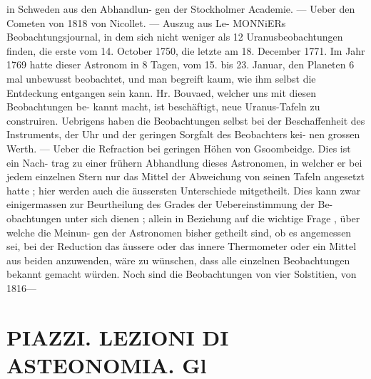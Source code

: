\documentclass[12pt,a4paper]{article}
\begin{document}
{{{{{{{{ in  Schweden  aus  den  Abhandlun- gen der  Stockholmer  Academie.  ---  Ueber  den  Cometen  von  1818  von  Nicollet.  ---  Auszug  aus  Le- MONNiERs  Beobachtungsjournal,  in  dem  sich  nicht  weniger  als  12  Uranusbeobachtungen  finden,  die  erste vom  14.  October  1750,  die  letzte  am  18.  December  1771.  Im  Jahr  1769  hatte  dieser  Astronom  in  8  Tagen, vom  15.  bis  23.  Januar,  den  Planeten  6  mal  unbewusst  beobachtet,  und  man  begreift  kaum,  wie  ihm selbst  die  Entdeckung  entgangen  sein  kann.  Hr.  Bouvaed,  welcher  uns  mit  diesen  Beobachtungen  be- kannt macht,  ist  beschäftigt,  neue  Uranus-Tafeln  zu  construiren.  Uebrigens  haben  die  Beobachtungen selbst  bei  der  Beschaffenheit  des  Instruments,  der  Uhr  und  der  geringen  Sorgfalt  des  Beobachters  kei- nen grossen  Werth.  ---  Ueber  die  Refraction  bei  geringen  Höhen  von  Gsoombeidge.  Dies  ist  ein  Nach- trag zu  einer  frühern  Abhandlung  dieses  Astronomen,  in  welcher  er  bei  jedem  einzelnen  Stern  nur  das Mittel  der  Abweichung  von  seinen  Tafeln  angesetzt  hatte ;  hier  werden  auch  die  äussersten  Unterschiede mitgetheilt.  Dies  kann  zwar  einigermassen  zur  Beurtheilung  des  Grades  der  Uebereinstimmung  der  Be- obachtungen unter  sich  dienen ;  allein  in  Beziehung  auf  die  wichtige  Frage ,  über  welche  die  Meinun- gen der  Astronomen  bisher  getheilt  sind,  ob  es  angemessen  sei,  bei  der  Reduction  das  äussere  oder  das innere  Thermometer  oder  ein  Mittel  aus  beiden  anzuwenden,  wäre  zu  wünschen,  dass  alle  einzelnen Beobachtungen  bekannt  gemacht  würden.     Noch  sind  die  Beobachtungen  von  vier  Solstitien,  von  1816---


\section*{PIAZZI.     LEZIONI  DI  ASTEONOMIA.  Gl}

}}}}}}}}
\end{document}
